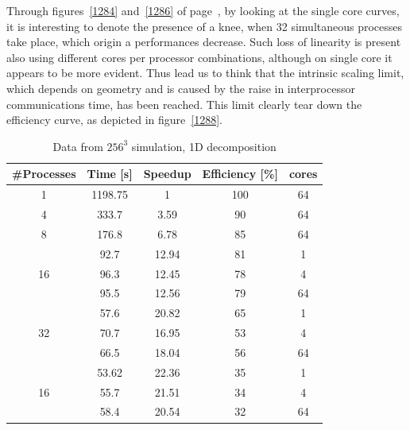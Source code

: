Through figures~\ref{1284} and~\ref{1286} of page~\pageref{1284}, by looking at the single core curves, it is interesting to denote the presence of a knee, when 32 simultaneous processes take place, which origin a performances decrease. Such loss of linearity is present also using different cores per processor combinations, although on single core it appears to be more evident. Thus lead us to think that the intrinsic scaling limit, which depends on geometry and is caused by the raise in interprocessor communications time, has been reached. This limit clearly tear down the efficiency curve, as depicted in figure~\ref{1288}.\\

\begin{table}
\caption{Data from $256^{3}$ simulation, 1D decomposition}
\begin{center}
\begin{tabular}{c c c c c}
\toprule
\textbf{\#Processes} & \textbf{Time [s]} & \textbf{Speedup} & \textbf{Efficiency [\%]} & \textbf{cores}\\
\midrule
1 & 1198.75 & 1 & 100 & 64\\
4 &  333.7 & 3.59 & 90 & 64\\
8 &  176.8 & 6.78 & 85 & 64\\
\hline
\multirow{3}{*}{16} &  92.7 & 12.94 & 81 & 1\\
& 96.3 & 12.45 & 78 & 4\\
& 95.5 & 12.56 & 79 & 64\\
\hline
\multirow{3}{*}{32} &  57.6 & 20.82 & 65 & 1\\
& 70.7 & 16.95 & 53 & 4\\
& 66.5 & 18.04 & 56 & 64\\
\hline
\multirow{3}{*}{16} &  53.62 & 22.36 & 35 & 1\\
& 55.7 & 21.51 & 34 & 4\\
& 58.4 & 20.54 & 32 & 64\\
\bottomrule
\end{tabular}
\end{center}
\label{128:data:1}
\end{table}

